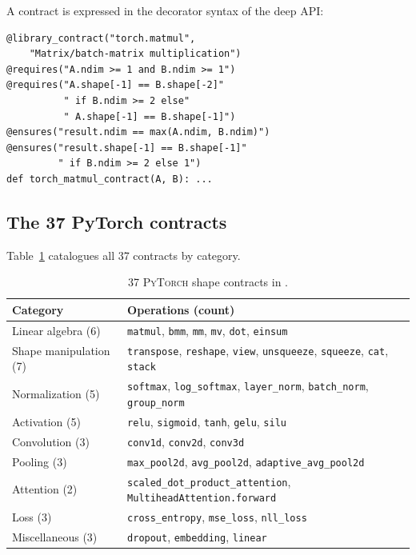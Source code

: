 \documentclass[11pt]{article}
\newcommand{\PyTorch}{\textsc{PyTorch}\xspace}
\begin{document}
A contract is expressed in the \Python decorator syntax of the deep
API:

\begin{lstlisting}[style=jugeo-python,caption={Example: \texttt{torch.matmul} contract.}]
@library_contract("torch.matmul",
    "Matrix/batch-matrix multiplication")
@requires("A.ndim >= 1 and B.ndim >= 1")
@requires("A.shape[-1] == B.shape[-2]"
          " if B.ndim >= 2 else"
          " A.shape[-1] == B.shape[-1]")
@ensures("result.ndim == max(A.ndim, B.ndim)")
@ensures("result.shape[-1] == B.shape[-1]"
         " if B.ndim >= 2 else 1")
def torch_matmul_contract(A, B): ...
\end{lstlisting}

\subsection{The 37 PyTorch contracts}

Table~\ref{tab:pytorch} catalogues all 37 contracts by category.

\begin{table}[H]
\centering
\caption{37 \PyTorch shape contracts in \JuGeo.}
\label{tab:pytorch}
\begin{tabularx}{\linewidth}{@{}lX@{}}
\toprule
\textbf{Category} & \textbf{Operations (count)} \\
\midrule
Linear algebra (6)
  & \texttt{matmul}, \texttt{bmm}, \texttt{mm}, \texttt{mv},
    \texttt{dot}, \texttt{einsum} \\
Shape manipulation (7)
  & \texttt{transpose}, \texttt{reshape}, \texttt{view},
    \texttt{unsqueeze}, \texttt{squeeze}, \texttt{cat}, \texttt{stack} \\
Normalization (5)
  & \texttt{softmax}, \texttt{log\_softmax}, \texttt{layer\_norm},
    \texttt{batch\_norm}, \texttt{group\_norm} \\
Activation (5)
  & \texttt{relu}, \texttt{sigmoid}, \texttt{tanh},
    \texttt{gelu}, \texttt{silu} \\
Convolution (3)
  & \texttt{conv1d}, \texttt{conv2d}, \texttt{conv3d} \\
Pooling (3)
  & \texttt{max\_pool2d}, \texttt{avg\_pool2d},
    \texttt{adaptive\_avg\_pool2d} \\
Attention (2)
  & \texttt{scaled\_dot\_product\_attention},
    \texttt{MultiheadAttention.forward} \\
Loss (3)
  & \texttt{cross\_entropy}, \texttt{mse\_loss}, \texttt{nll\_loss} \\
Miscellaneous (3)
  & \texttt{dropout}, \texttt{embedding}, \texttt{linear} \\
\bottomrule
\end{tabularx}
\end{table}
\end{document}
